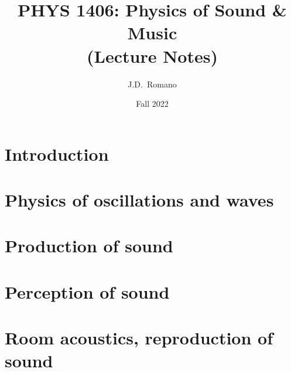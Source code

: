\documentclass[10pt,twoside]{article}
\numberwithin{equation}{section}
\begin{document}
\title{PHYS 1406: Physics of Sound \& Music\\
(Lecture Notes)}
\author{J.D.\ Romano}
\date{Fall 2022}
\maketitle
 
\begin{abstract}

\end{abstract}

\cleardoublepage
\tableofcontents

\cleardoublepage
\part{Introduction}

\cleardoublepage


\cleardoublepage
\part{Physics of oscillations and waves}

\cleardoublepage


\cleardoublepage


\cleardoublepage


\cleardoublepage
\part{Production of sound}

\cleardoublepage


\cleardoublepage


\cleardoublepage


\cleardoublepage


\cleardoublepage


\cleardoublepage
\part{Perception of sound}

\cleardoublepage


\cleardoublepage


\cleardoublepage


\cleardoublepage
\part{Room acoustics, reproduction of sound}
\end{document}
